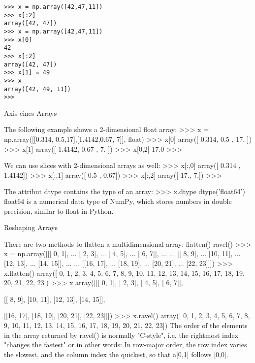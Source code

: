 \begin{framed}
\begin{verbatim}
>>> x = np.array([42,47,11])
>>> x[:2]
array([42, 47])
>>> x = np.array([42,47,11])
>>> x[0]
42
>>> x[:2]
array([42, 47])
>>> x[1] = 49
>>> x
array([42, 49, 11])
>>>
\end{verbatim}
\end{framed}
Axis eines Arrays

The following example shows a 2-dimensional float array:
>>> x = np.array([[0.314, 0.5,17],[1.4142,0.67, 7]], float)
>>> x[0]
array([  0.314,   0.5  ,  17.   ])
>>> x[1]
array([ 1.4142,  0.67  ,  7.    ])
>>> x[0,2]
17.0
>>>

We can use slices with 2-dimensional arrays as well:
>>> x[:,0]
array([ 0.314 ,  1.4142])
>>> x[:,1]
array([ 0.5 ,  0.67])
>>> x[:,2]
array([ 17.,   7.])
>>> 

The attribut dtype contains the type of an array:
>>> x.dtype
dtype('float64')
float64 is a numerical data type of NumPy, which stores numbers in double precision, similar to float in Python.

Reshaping Arrays

There are two methods to flatten a multidimensional array:
flatten()
ravel()
>>> x = np.array([[[ 0,  1],
...         [ 2,  3],
...         [ 4,  5],
...         [ 6,  7]],
... 
...        [[ 8,  9],
...         [10, 11],
...         [12, 13],
...         [14, 15]],
... 
...        [[16, 17],
...         [18, 19],
...         [20, 21],
...         [22, 23]]])
>>> x.flatten()
array([ 0,  1,  2,  3,  4,  5,  6,  7,  8,  9, 10, 11, 12, 13, 14, 15, 16,
       17, 18, 19, 20, 21, 22, 23])
>>> x
array([[[ 0,  1],
        [ 2,  3],
        [ 4,  5],
        [ 6,  7]],

       [[ 8,  9],
        [10, 11],
        [12, 13],
        [14, 15]],

       [[16, 17],
        [18, 19],
        [20, 21],
        [22, 23]]])
>>> x.ravel()
array([ 0,  1,  2,  3,  4,  5,  6,  7,  8,  9, 10, 11, 12, 13, 14, 15, 16,
       17, 18, 19, 20, 21, 22, 23])
The order of the elements in the array returned by ravel() is normally "C-style", i.e. the rightmost index "changes the fastest" or in other words: In row-major order, the row index varies the slowest, and the column index the quickest, so that a[0,1] follows [0,0]. 


